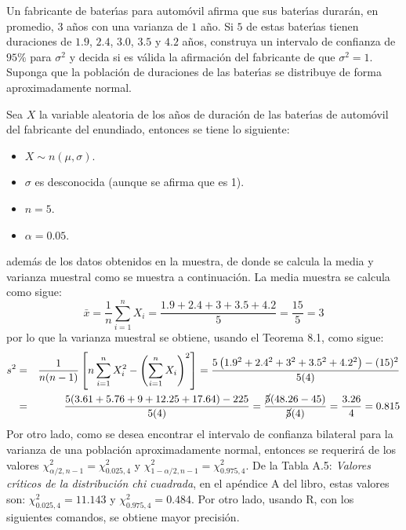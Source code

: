 \begin{enunciado}
 Un fabricante de bater\'{\i}as para autom\'ovil afirma que sus bater\'{\i}as durar\'an, en promedio, $3$ a\~nos con una varianza de $1$ a\~no. Si $5$ de estas bater\'{\i}as tienen duraciones de $1.9$, $2.4$, $3.0$, $3.5$ y $4.2$ a\~nos, construya un intervalo de confianza de $95\%$ para $\sigma^2$ y decida si es v\'alida la afirmaci\'on del fabricante de que $\sigma^2 = 1$. Suponga que la poblaci\'on de duraciones de las bater\'{\i}as se distribuye de forma aproximadamente normal.
\end{enunciado}

\begin{solucion}
 Sea $X$ la variable aleatoria de los a\~nos de duraci\'on de las bater\'{\i}as de autom\'ovil del fabricante del enundiado, entonces se tiene lo siguiente:
 \begin{itemize}
  \item $X \sim n( \mu, \sigma )$.
  \item $\sigma$ es desconocida (aunque se afirma que es 1).
  \item $n = 5$.
  \item $\alpha = 0.05$.
 \end{itemize}
 adem\'as de los datos obtenidos en la muestra, de donde se calcula la media y varianza muestral como se muestra a continuaci\'on. La media muestra se calcula como sigue:
 \begin{equation*}
  \bar{x} = \frac{1}{n}\sum_{i=1}^n X_i = \frac{1.9+2.4+3+3.5+4.2}{5} = \frac{15}{5} = 3
 \end{equation*}
 por lo que la varianza muestral se obtiene, usando el Teorema 8.1, como sigue:
 \begin{eqnarray*}
  s^2 & = & \frac{1}{n(n-1)} \left[ n \sum_{i=1}^n X_i^2 - \left( \sum_{i=1}^n X_i \right)^2 \right] = \frac{5\left( 1.9^2 + 2.4^2 + 3^2 + 3.5^2 + 4.2^2 \right) - (15)^2}{5(4)} \\
  & = & \frac{5(3.61+5.76+9+12.25+17.64) - 225}{5(4)} = \frac{\cancel{5}(48.26 - 45)}{\cancel{5}(4)} = \frac{3.26}{4} = 0.815
 \end{eqnarray*}
 Por otro lado, como se  desea encontrar el intervalo de confianza bilateral para la varianza de una poblaci\'on aproximadamente normal, entonces se requerir\'a de los valores $\chi^2_{\alpha/2,n-1} = \chi^2_{0.025,4}$ y $\chi^2_{1-\alpha/2,n-1} = \chi^2_{0.975,4}$. De la Tabla A.5: \textit{Valores cr\'{\i}ticos de la distribuci\'on chi cuadrada}, en el ap\'endice A del libro, estas valores son: $\chi^2_{0.025,4}=11.143$ y $\chi^2_{0.975,4}=0.484$. Por otro lado, usando R, con los siguientes comandos, se obtiene mayor precisi\'on.

\end{solucion}
